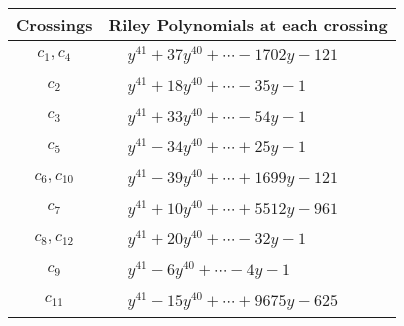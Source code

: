 \documentclass[1p]{elsarticle_modified}
\theoremstyle{definition}
\begin{document}
\begin{tabular}{m{50pt}|m{274pt}}
Crossings & \hspace{64pt}Riley Polynomials at each crossing \\
\hline $$\begin{aligned}c_{1},c_{4}\end{aligned}$$&$\begin{aligned}
&y^{41}+37 y^{40}+\cdots-1702 y-121
\end{aligned}$\\
\hline $$\begin{aligned}c_{2}\end{aligned}$$&$\begin{aligned}
&y^{41}+18 y^{40}+\cdots-35 y-1
\end{aligned}$\\
\hline $$\begin{aligned}c_{3}\end{aligned}$$&$\begin{aligned}
&y^{41}+33 y^{40}+\cdots-54 y-1
\end{aligned}$\\
\hline $$\begin{aligned}c_{5}\end{aligned}$$&$\begin{aligned}
&y^{41}-34 y^{40}+\cdots+25 y-1
\end{aligned}$\\
\hline $$\begin{aligned}c_{6},c_{10}\end{aligned}$$&$\begin{aligned}
&y^{41}-39 y^{40}+\cdots+1699 y-121
\end{aligned}$\\
\hline $$\begin{aligned}c_{7}\end{aligned}$$&$\begin{aligned}
&y^{41}+10 y^{40}+\cdots+5512 y-961
\end{aligned}$\\
\hline $$\begin{aligned}c_{8},c_{12}\end{aligned}$$&$\begin{aligned}
&y^{41}+20 y^{40}+\cdots-32 y-1
\end{aligned}$\\
\hline $$\begin{aligned}c_{9}\end{aligned}$$&$\begin{aligned}
&y^{41}-6 y^{40}+\cdots-4 y-1
\end{aligned}$\\
\hline $$\begin{aligned}c_{11}\end{aligned}$$&$\begin{aligned}
&y^{41}-15 y^{40}+\cdots+9675 y-625
\end{aligned}$\\
\hline
\end{tabular}\\~\\
\end{document}
